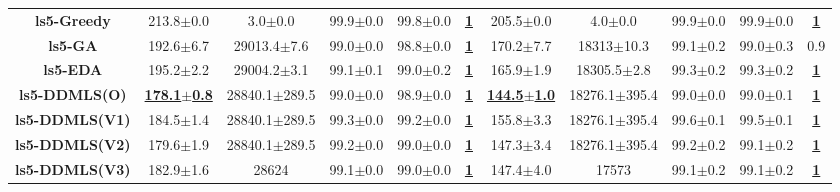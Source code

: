 \documentclass[lettersize,journal]{IEEEtran}
\begin{document}
\begin{table}[!t]
{\begin{tabular}{ccccccccccc}
    \midrule
    {\bfseries ls5-Greedy} &213.8$\pm$0.0 &3.0$\pm$0.0 & 99.9$\pm$0.0 &99.8$\pm$0.0 &\underline{\bfseries 1} &205.5$\pm$0.0 &4.0$\pm$0.0& 99.9$\pm$0.0 &99.9$\pm$0.0 &\underline{\bfseries 1} \\
    {\bfseries ls5-GA} &192.6$\pm$6.7 &29013.4$\pm$7.6 & 99.0$\pm$0.0 &98.8$\pm$0.0 &\underline{\bfseries 1} &170.2$\pm$7.7 &18313$\pm$10.3& 99.1$\pm$0.2 &99.0$\pm$0.3 &0.9 \\
    {\bfseries ls5-EDA} &195.2$\pm$2.2 &29004.2$\pm$3.1 & 99.1$\pm$0.1 &99.0$\pm$0.2 &\underline{\bfseries 1} &165.9$\pm$1.9 &18305.5$\pm$2.8& 99.3$\pm$0.2 &99.3$\pm$0.2 &\underline{\bfseries 1} \\
    \bfseries ls5-DDMLS(O) &\underline{\bfseries 178.1$\pm$0.8} &28840.1$\pm$289.5 & 99.0$\pm$0.0 &98.9$\pm$0.0 &\underline{\bfseries 1} &\underline{\bfseries 144.5$\pm$1.0} &18276.1$\pm$395.4& 99.0$\pm$0.0 &99.0$\pm$0.1 &\underline{\bfseries 1} \\
    {\bfseries ls5-DDMLS(V1)} &184.5$\pm$1.4 &28840.1$\pm$289.5 & 99.3$\pm$0.0 &99.2$\pm$0.0 &\underline{\bfseries 1} &155.8$\pm$3.3 &18276.1$\pm$395.4& 99.6$\pm$0.1 &99.5$\pm$0.1 &\underline{\bfseries 1} \\
    {\bfseries ls5-DDMLS(V2)} &179.6$\pm$1.9 &28840.1$\pm$289.5 & 99.2$\pm$0.0 &99.0$\pm$0.0 &\underline{\bfseries 1} &147.3$\pm$3.4 &18276.1$\pm$395.4& 99.2$\pm$0.2 &99.1$\pm$0.2 &\underline{\bfseries 1} \\
    {\bfseries ls5-DDMLS(V3)} &182.9$\pm$1.6 &28624 & 99.1$\pm$0.0 &99.0$\pm$0.0 &\underline{\bfseries 1} &147.4$\pm$4.0 &17573& 99.1$\pm$0.2 &99.1$\pm$0.2 &\underline{\bfseries 1} \\
    

\end{tabular}}
\end{table}
\end{document}

